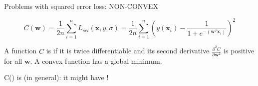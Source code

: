 \documentclass[usenames,dvipsnames]{beamer}
\begin{document}
\begin{frame}{Problems with squared error loss: NON-CONVEX}

  \[
  C(\pmb{w}) = \frac{1}{2n} \sum_{i=1}^n  L_{sel}(\pmb{x}, y, \sigma) = \frac{1}{2n} \sum_{i=1}^n (y(\pmb{x}_i) - \frac{1}{1 + e^{-(\pmb{w}^T \pmb{x}_i)}})^2
  \]
  
  \bigskip
  
  A function $C$ is  if it is twice differentiable and its second derivative $\frac{\partial^2{C}}{{\partial \pmb{w}^2}}$ is positive for all $\pmb{w}$. A convex function has a global minimum.
  
  \bigskip
  
  \begin{alertblock}{}
\centering
C() is  (in general): it might  have !
\end{alertblock}
 
\end{frame}

\end{document}

